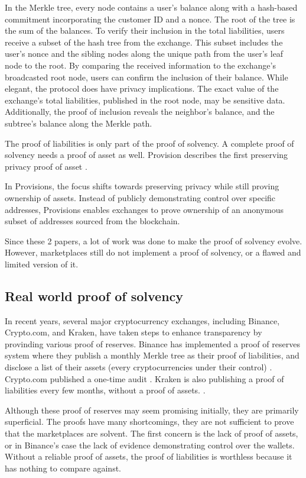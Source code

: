 In the Merkle tree, every node contains a user's balance along with a hash-based commitment incorporating the customer ID and a nonce. The root of the tree is the sum of the balances.
To verify their inclusion in the total liabilities, users receive a subset of the hash tree from the exchange. This subset includes the user's nonce and the sibling nodes along the unique path from the user's leaf node to the root.
By comparing the received information to the exchange's broadcasted root node, users can confirm the inclusion of their balance.
While elegant, the protocol does have privacy implications. The exact value of the exchange's total liabilities, published in the root node, may be sensitive data.
Additionally, the proof of inclusion reveals the neighbor's balance, and the subtree's balance along the Merkle path.

The proof of liabilities is only part of the proof of solvency. A complete proof of solvency needs a proof of asset as well.
Provision describes the first preserving privacy proof of asset \cite{DBBBCC15}.

In Provisions, the focus shifts towards preserving privacy while still proving ownership of assets.
Instead of publicly demonstrating control over specific addresses, Provisions enables exchanges to prove ownership of an anonymous subset of addresses sourced from the blockchain.

Since these 2 papers, a lot of work was done to make the proof of solvency evolve. However, marketplaces still do not implement a proof of solvency, or a flawed and limited version of it.


\subsection{Real world proof of solvency}
In recent years, several major cryptocurrency exchanges, including Binance, Crypto.com, and Kraken, have taken steps to enhance transparency by provinding various proof of reserves.
Binance has implemented a proof of reserves system where they publish a monthly Merkle tree as their proof of liabilities, and disclose a list of their assets (every cryptocurrencies under their control) \cite{BPR}.
Crypto.com published a one-time audit \cite{CC22}.
Kraken is also publishing a proof of liabilities every few months, without a proof of assets. \cite{KK23}.

Although these proof of reserves may seem promising initially, they are primarily superficial.
The proofs have many shortcomings, they are not sufficient to prove that the marketplaces are solvent.
The first concern is the lack of proof of assets, or in Binance's case the lack of evidence demonstrating control over the wallets.
Without a reliable proof of assets, the proof of liabilities is worthless because it has nothing to compare against.

